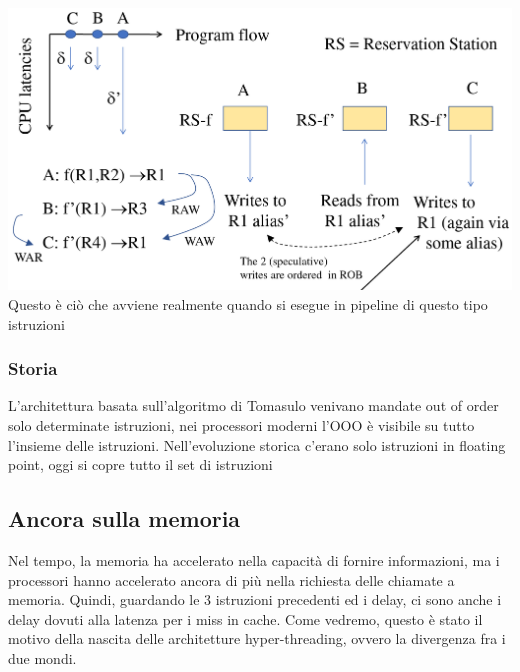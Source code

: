 \documentclass[14pt]{article}
\begin{document}
\\\\
\includegraphics[scale=0.25]{immagini/ex-pipeline}\\
Questo è ciò che avviene realmente quando si esegue in pipeline di questo tipo istruzioni 
\subsubsection{Storia}
L'architettura basata sull'algoritmo di Tomasulo venivano mandate out of order solo determinate istruzioni, nei processori moderni l'OOO è visibile su tutto l'insieme delle istruzioni. Nell'evoluzione storica c'erano solo istruzioni in floating point, oggi si copre tutto il set di istruzioni
\subsection{Ancora sulla memoria}
Nel tempo, la memoria ha accelerato nella capacità di fornire informazioni, ma i processori hanno accelerato ancora di più nella richiesta delle chiamate a memoria. Quindi, guardando le 3 istruzioni precedenti ed i delay, ci sono anche i delay dovuti alla latenza per i miss in cache. Come vedremo, questo è stato il motivo della nascita delle architetture hyper-threading, ovvero la divergenza fra i due mondi.
\end{document}
